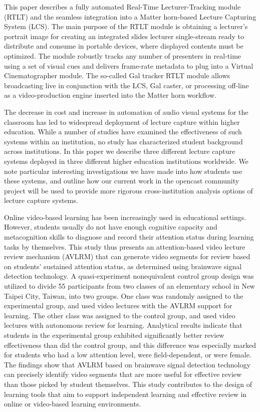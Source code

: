 This paper describes a fully automated Real-Time Lecturer-Tracking module (RTLT) and the seamless integration into a Matter horn-based Lecture Capturing System (LCS). The main purpose of the RTLT module is obtaining a lecturer's portrait image for creating an integrated slides lecturer single-stream ready to distribute and consume in portable devices, where displayed contents must be optimized. The module robustly tracks any number of presenters in real-time using a set of visual cues and delivers frame-rate metadata to plug into a Virtual Cinematographer module. The so-called Gal tracker RTLT module allows broadcasting live in conjunction with the LCS, Gal caster, or processing off-line as a video-production engine inserted into the Matter horn workflow. \cite{Gonzalez-Agulla2013}


The decrease in cost and increase in automation of audio visual systems for the classroom has led to widespread deployment of lecture capture within higher education. While a number of studies have examined the effectiveness of such systems within an institution, no study has characterized student background across institutions. In this paper we describe three different lecture capture systems deployed in three different higher education institutions worldwide. We note particular interesting investigations we have made into how students use these systems, and outline how our current work in the opencast community project will be used to provide more rigorous cross-institution analysis options of lecture capture systems.\cite{Barokas2010}


Online video-based learning has been increasingly used in educational settings. However, students usually do not have enough cognitive capacity and metacognition skills to diagnose and record their attention status during learning tasks by themselves. This study thus presents an attention-based video lecture review mechanism (AVLRM) that can generate video segments for review based on students’ sustained attention status, as determined using brainwave signal detection technology. A quasi-experiment nonequivalent control group design was utilized to divide 55 participants from two classes of an elementary school in New Taipei City, Taiwan, into two groups. One class was randomly assigned to the experimental group, and used video lectures with the AVLRM support for learning. The other class was assigned to the control group, and used video lectures with autonomous review for learning. Analytical results indicate that students in the experimental group exhibited significantly better review effectiveness than did the control group, and this difference was especially marked for students who had a low attention level, were field-dependent, or were female. The findings show that AVLRM based on brainwave signal detection technology can precisely identify video segments that are more useful for effective review than those picked by student themselves. This study contributes to the design of learning tools that aim to support independent learning and effective review in online or video-based learning environments.\cite{Lin2019}



